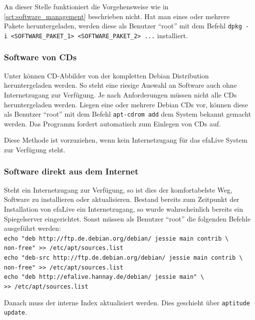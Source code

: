 \documentclass[a4paper,12pt,twoside]{article}
\begin{document}
An dieser Stelle funktioniert die Vorgehensweise wie in \ref{sct:software_management}
beschrieben nicht. Hat man eines oder mehrere Pakete heruntergeladen,
werden diese als Benutzer "`root"' mit dem
Befehl \texttt{dpkg -i {\textless}SOFTWARE\_PAKET\_1{\textgreater}
{\textless}SOFTWARE\_PAKET\_2{\textgreater} ...} installiert. 


\subsubsection{Software von CDs}
\label{sct:software_cd}
Unter \cite{DEB4} können CD-Abbilder von der kompletten Debian
Distribution heruntergeladen werden. So steht eine riesige Auswahl an
Software auch ohne Internetzugang zur Verfügung. Je nach Anforderungen
müssen nicht alle CDs heruntergeladen werden. Liegen eine oder mehrere
Debian CDs vor, können diese als Benutzer
"`root"' mit dem Befehl
\texttt{apt-cdrom add} dem System bekannt gemacht
werden. Das Programm fordert automatisch zum Einlegen von CDs auf.

Diese Methode ist vorzuziehen, wenn kein Internetzugang für das efaLive
System zur Verfügung steht.


\subsubsection{Software direkt aus dem Internet}
\label{sct:software_internet}
Steht ein Internetzugang zur Verfügung, so ist dies der komfortabelste
Weg, Software zu installieren oder aktualisieren. Bestand bereits zum
Zeitpunkt der Installation von efaLive ein Internetzugang, so wurde
wahrscheinlich bereits ein Spiegelserver eingerichtet. Sonst müssen als
Benutzer "`root"' die folgenden Befehle ausgeführt werden:
\bigskip
\\
\texttt{echo "deb http://ftp.de.debian.org/debian/ jessie main contrib \textbackslash\\
    non-free"\ {\textgreater}{\textgreater} /etc/apt/sources.list}
\\
\texttt{echo "deb-src http://ftp.de.debian.org/debian/ jessie main contrib \textbackslash\\
    non-free"\ {\textgreater}{\textgreater} /etc/apt/sources.list}
\\
\texttt{echo "deb http://efalive.hannay.de/debian/ jessie main" \textbackslash\\
    {\textgreater}{\textgreater} /etc/apt/sources.list}

\bigskip
Danach muss der interne Index aktualisiert werden. Dies geschieht über
\texttt{aptitude update}.
\end{document}
